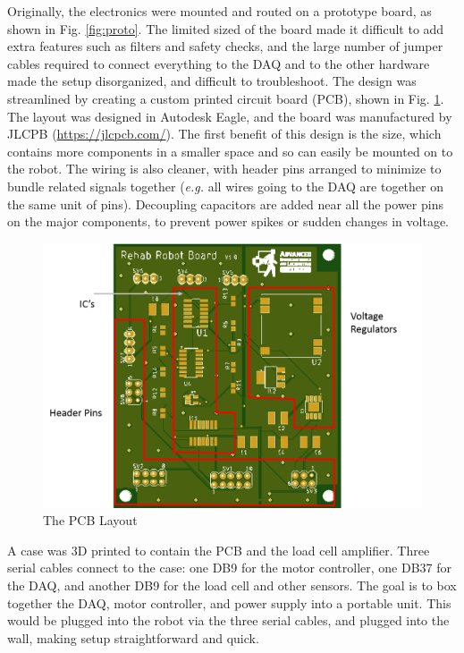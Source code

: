 \documentclass[12pt]{report}
\begin{document}
		Originally, the electronics were mounted and routed on a prototype board, as shown in Fig. \ref{fig:proto}. The limited sized of the board made it difficult to add extra features such as filters and safety checks, and the large number of jumper cables required to connect everything to the DAQ and to the other hardware made the setup disorganized, and difficult to troubleshoot. The design was streamlined by creating a custom printed circuit board (PCB), shown in Fig. \ref{fig:pcb_pic}. The layout was designed in Autodesk Eagle, and the board was manufactured by JLCPB (\url{https://jlcpcb.com/}). The first benefit of this design is the size, which contains more components in a smaller space and so can easily be mounted on to the robot. The wiring is also cleaner, with header pins arranged to minimize to bundle related signals together (\textit{e.g.} all wires going to the DAQ are together on the same unit of pins). Decoupling capacitors are added near all the power pins on the major components, to prevent power spikes or sudden changes in voltage.
		
		\begin{figure}[h] 
		\centering
		\includegraphics[width=0.9\linewidth]{pcb_pic2}
		\caption{ The PCB Layout}
		\label{fig:pcb_pic}
	\end{figure}
	
		
		
		A case was 3D printed to contain the PCB and the load cell amplifier. Three serial cables connect to the case: one DB9 for the motor controller, one DB37 for the DAQ, and another DB9 for the load cell and other sensors. The goal is to box together the DAQ, motor controller, and power supply into a portable unit. This would be plugged into the robot via the three serial cables, and plugged into the wall, making setup straightforward and quick. 
		
\end{document}

